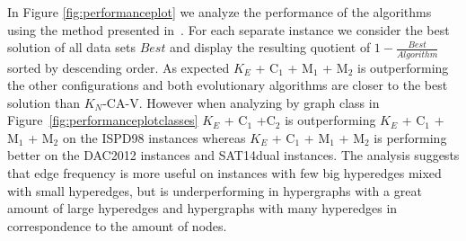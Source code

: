 \documentclass[a4paper,12pt,titlepage, BCOR7mm,headsepline]{scrbook}
\numberwithin{equation}{section}
\begin{document}
In Figure \ref{fig:performanceplot} we analyze the performance of the algorithms using the method presented in~\cite{schlag2016k}. For each separate instance we consider the best solution of all data sets $Best$ and display the resulting quotient of $1 - \frac{Best}{Algorithm}$ sorted by descending order. As expected $K_E$ + C$_1$ + M$_1$ + M$_2$ is outperforming the other configurations and both evolutionary algorithms are closer to the best solution than $K_N$-CA-V. However when analyzing by graph class in Figure~\ref{fig:performanceplotclasses} $K_E$ + C$_1$ +C$_2$ is outperforming $K_E$ + C$_1$ + M$_1$ + M$_2$ on the ISPD98 instances whereas $K_E$ + C$_1$ + M$_1$ + M$_2$ is performing better on the DAC2012 instances and SAT14dual instances. The analysis suggests that edge frequency is more useful on instances with few big hyperedges mixed with small hyperedges, but is underperforming in hypergraphs with a great amount of large hyperedges and hypergraphs with many hyperedges in correspondence to the amount of nodes.
\end{document}
